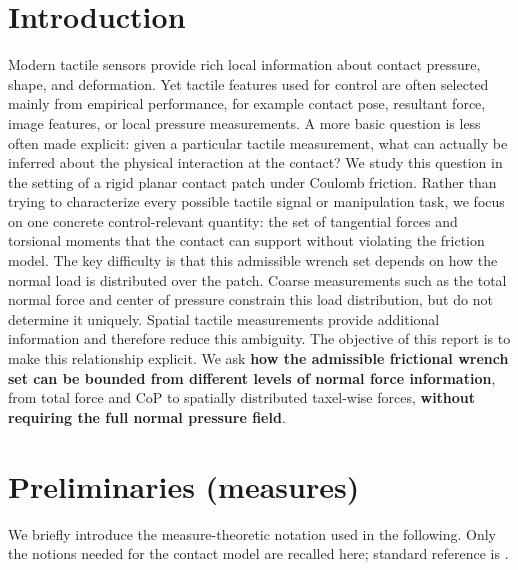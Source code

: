 \documentclass[11pt,a4paper]{article}
\theoremstyle{plain}
\begin{document}
\section{Introduction}
Modern tactile sensors provide rich local information about contact pressure, shape, and deformation. Yet tactile features used for control are often selected mainly from empirical performance, for example contact pose, resultant force, image features, or local pressure measurements. A more basic question is less often made explicit: given a particular tactile measurement, what can actually be inferred about the physical interaction at the contact?
We study this question in the setting of a rigid planar contact patch under Coulomb friction. Rather than trying to characterize every possible tactile signal or manipulation task, we focus on one concrete control-relevant quantity: the set of tangential forces and torsional moments that the contact can support without violating the friction model.
The key difficulty is that this admissible wrench set depends on how the normal load is distributed over the patch. Coarse measurements such as the total normal force and center of pressure constrain this load distribution, but do not determine it uniquely. Spatial tactile measurements provide additional information and therefore reduce this ambiguity.
The objective of this report is to make this relationship explicit. We ask \textbf{how the admissible frictional wrench set can be bounded from different levels of normal force information}, from total force and CoP to spatially distributed taxel-wise forces, \textbf{without requiring the full normal pressure field}.

\section{Preliminaries (measures)}
\label{sec:measure-preliminaries}

We briefly introduce the measure-theoretic notation used in the following.
Only the notions needed for the contact model are recalled here; standard reference
is \cite{evans2015measure}.
\end{document}
